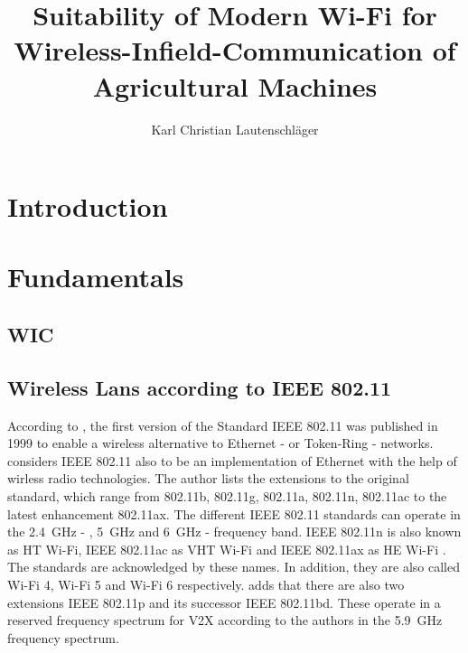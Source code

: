 \documentclass[]{nsm-thesis}
\author{Karl Christian Lautenschläger}
\title{Suitability of Modern Wi-Fi for Wireless-Infield-Communication of Agricultural Machines}
\begin{document}

\maketitle

\cleardoublepage





\tableofcontents

\cleardoublepage
{}


\chapter{Introduction}
\label{sec:introduction}


\chapter{Fundamentals}
\label{sec:fundamentals}


\section{\acl{WIC}}





\section{Wireless Lans according to IEEE 802.11}


According to \textcite{kauffels_wireless_2002}, the first version of the Standard IEEE 802.11 was published in 1999 to enable a wireless alternative to Ethernet - or Token-Ring - networks.
\textcite{sauter_wireless_2022} considers IEEE 802.11 also to be an implementation of Ethernet with the help of wirless radio technologies.
The author lists the extensions to the original standard, which range from 802.11b, 802.11g, 802.11a, 802.11n, 802.11ac to the latest enhancement 802.11ax. The different IEEE 802.11 standards can operate in the  \SI{2.4}{\giga\hertz} - , \SI{5}{\giga\hertz} and \SI{6}{\giga\hertz} - frequency band.
IEEE 802.11n is also known as \ac{HT} Wi-Fi, IEEE 802.11ac as \ac{VHT} Wi-Fi \cite{ieee_standard_2020} and IEEE 802.11ax as \ac{HE} Wi-Fi \cite{ieee_standard_2021ax}.
The standards are acknowledged by these names.
In addition, they are also called Wi-Fi 4, Wi-Fi 5 and Wi-Fi 6 respectively.
\textcite{jacob_system-level_2020} adds that there are also two extensions IEEE 802.11p and its successor IEEE 802.11bd. These operate in a reserved frequency spectrum for \ac{V2X} according to the authors in the \SI{5.9}{\giga\hertz} frequency spectrum.
\end{document}

